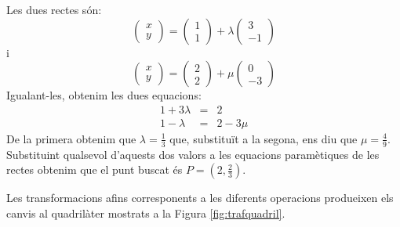 Les dues rectes són:
\[
\begin{pmatrix}x\\y\end{pmatrix}=
\begin{pmatrix}1\\1\end{pmatrix}+\lambda
\begin{pmatrix}3\\-1\end{pmatrix}
\]
i
\[
\begin{pmatrix}x\\y\end{pmatrix}=
\begin{pmatrix}2\\2\end{pmatrix}+\mu
\begin{pmatrix}0\\-3\end{pmatrix}
\]
Igualant-les, obtenim les dues equacions:
\begin{eqnarray*}
  1+3\lambda &=& 2\\
  1-\lambda&=&2-3\mu
\end{eqnarray*}
De la primera obtenim que $\lambda=\frac{1}{3}$ que, substituït a la segona, ens diu que $\mu=\frac{4}{9}$. Substituint qualsevol d'aquests dos valors a les equacions paramètiques de les rectes obtenim que el punt buscat és  $P=(2,\frac{2}{3})$.

Les transformacions afins corresponents a les diferents operacions produeixen els canvis al quadrilàter mostrats a la Figura \ref{fig:trafquadril}.

